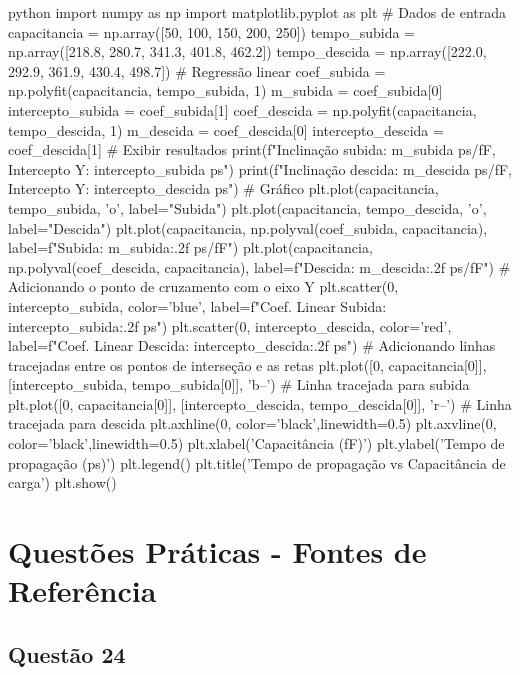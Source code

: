 ﻿\documentclass[12pt,a4paper]{article}
\begin{document}
\begin{codeblockm}{python}
import numpy as np
import matplotlib.pyplot as plt
# Dados de entrada
capacitancia = np.array([50, 100, 150, 200, 250])
tempo_subida = np.array([218.8, 280.7, 341.3, 401.8, 462.2])
tempo_descida = np.array([222.0, 292.9, 361.9, 430.4, 498.7])
# Regressão linear
coef_subida = np.polyfit(capacitancia, tempo_subida, 1)
m_subida = coef_subida[0]
intercepto_subida = coef_subida[1]
coef_descida = np.polyfit(capacitancia, tempo_descida, 1)
m_descida = coef_descida[0]
intercepto_descida = coef_descida[1]
# Exibir resultados
print(f"Inclinação subida: {m_subida} ps/fF, Intercepto Y: {intercepto_subida} ps")
print(f"Inclinação descida: {m_descida} ps/fF, Intercepto Y: {intercepto_descida} ps")
# Gráfico
plt.plot(capacitancia, tempo_subida, 'o', label="Subida")
plt.plot(capacitancia, tempo_descida, 'o', label="Descida")
plt.plot(capacitancia, np.polyval(coef_subida, capacitancia),
label=f"Subida: {m_subida:.2f} ps/fF")
plt.plot(capacitancia, np.polyval(coef_descida, capacitancia),
label=f"Descida: {m_descida:.2f} ps/fF")
# Adicionando o ponto de cruzamento com o eixo Y
plt.scatter(0, intercepto_subida, color='blue', label=f"Coef. Linear Subida: {intercepto_subida:.2f} ps")
plt.scatter(0, intercepto_descida, color='red', label=f"Coef. Linear Descida: {intercepto_descida:.2f} ps")
# Adicionando linhas tracejadas entre os pontos de interseção e as retas
plt.plot([0, capacitancia[0]], [intercepto_subida, tempo_subida[0]], 'b--')
# Linha tracejada para subida
plt.plot([0, capacitancia[0]], [intercepto_descida, tempo_descida[0]],
'r--') # Linha tracejada para descida
plt.axhline(0, color='black',linewidth=0.5)
plt.axvline(0, color='black',linewidth=0.5)
plt.xlabel('Capacitância (fF)')
plt.ylabel('Tempo de propagação (ps)')
plt.legend()
plt.title('Tempo de propagação vs Capacitância de carga')
plt.show()
\end{codeblockm}

\newpage

\section*{Questões Práticas - Fontes de Referência}

\subsection*{Questão 24}
\end{document}
